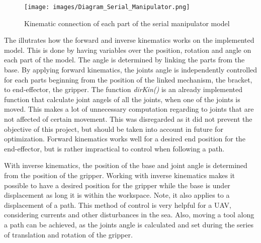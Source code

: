 \begin{figure}[ht]
    \centering
    \texttt{[image: images/Diagram\_Serial\_Manipulator.png]}
    \caption[Kinematic connection of  each part of the serial manipulator model]{Kinematic connection of  each part of the serial manipulator model}
    \label{fig:KinematicsSerialManipulator}
\end{figure}


The  illutrates how the forward and inverse kinematics works on the implemented model. This is done by having variables over the position, rotation and angle on each part of the model. The angle is determined by linking the parts from the base. By applying forward kinematics, the joints angle is independently controlled for each parts beginning from the position of the linked mechanism, the bracket, to end-effector, the gripper. The function \textit{dirKin()} is an already implemented function that calculate joint angels of all the joints, when one of the joints is moved. This makes a lot of unnecessary computation regarding to joints that are not affected of certain movement. This was disregarded as it did not prevent the objective of this project, but should be taken into account in future for optimization. Forward kinematics works well for a desired end position for the end-effector, but is rather impractical to control when following a path.

With inverse kinematics, the position of the base and joint angle is determined from the position of the gripper. Working with inverse kinematics makes it possible to have a desired position for the gripper while the base is under displacement as long it is within the workspace. Note, it also applies to a displacement of a path. This method of control is very helpful for a UAV, considering currents and other disturbances in the sea. Also, moving a tool along a path can be achieved, as the joints angle is calculated and set during the series of translation and rotation of the gripper. 


